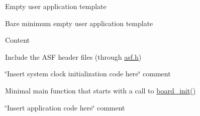 \begin{DoxyParagraph}{Empty user application template}

\end{DoxyParagraph}
Bare minimum empty user application template

\begin{DoxyParagraph}{Content}

\end{DoxyParagraph}

\begin{DoxyEnumerate}
\item Include the A\-S\-F header files (through \hyperlink{asf_8h}{asf.\-h})
\item \char`\"{}\-Insert system clock initialization code here\char`\"{} comment
\item Minimal main function that starts with a call to \hyperlink{group__group__common__boards_ga916f2adc2080b4fe88034086d107a8dc}{board\-\_\-init()}
\item \char`\"{}\-Insert application code here\char`\"{} comment 
\end{DoxyEnumerate}